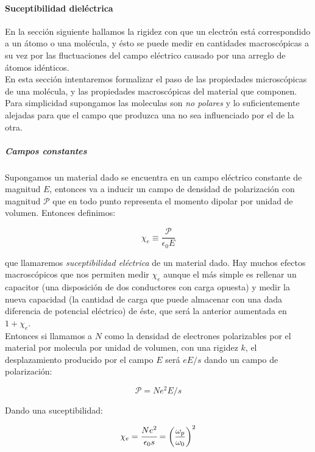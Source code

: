 \documentclass[a4paper,spanish]{article}
\numberwithin{equation}{section}
\begin{document}
\paragraph{Suceptibilidad diel\'ectrica}
En la secci\'on siguiente hallamos la rigidez con que un electr\'on est\'a correspondido a un \'atomo o una mol\'ecula, y \'esto se puede medir en cantidades macrosc\'opicas a su vez por las fluctuaciones del campo el\'ectrico causado por una arreglo de \'atomos id\'enticos.\\
En esta secci\'on intentaremos formalizar el paso de las propiedades microsc\'opicas de una mol\'ecula, y las propiedades macrosc\'opicas del material que componen. Para simplicidad supongamos las moleculas son \textit{no polares} y lo suficientemente alejadas para que el campo que produzca una no sea influenciado por el de la otra.

\subparagraph{Campos constantes}
Supongamos un material dado se encuentra en un campo el\'ectrico constante de magnitud $E$, entonces va a inducir un campo de densidad de polarizaci\'on con magnitud $\mathcal{P}$ que en todo punto representa el momento dipolar por unidad de volumen. Entonces definimos:

\begin{equation}
\chi_e \equiv \frac{\mathcal{P}}{\epsilon_0 E}
\label{suceptibilidad_campocte}
\end{equation}

que llamaremos \textit{suceptibilidad el\'ectrica} de un material dado. Hay muchos efectos macrosc\'opicos que nos permiten medir $\chi_e$ aunque el m\'as simple es rellenar un capacitor (una disposici\'on de dos conductores con carga opuesta) y medir la nueva capacidad (la cantidad de carga que puede almacenar con una dada diferencia de potencial el\'ectrico) de \'este, que ser\'a la anterior aumentada en $1+\chi_e$.\\
Entonces si llamamos a $N$ como la densidad de electrones polarizables por el material por molecula por unidad de volumen, con una rigidez $k$, el desplazamiento producido por el campo $E$ ser\'a $eE / s$ dando un campo de polarizaci\'on:

\[\mathcal{P}=Ne^2 E / s\]

Dando una suceptibilidad:

\begin{equation}
\chi_e = \cfrac{N e^2}{\epsilon_0 s} = \left( \frac {\omega_p}{\omega_0} \right) ^2
\label{suceptibilidad}
\end{equation}
\end{document}
